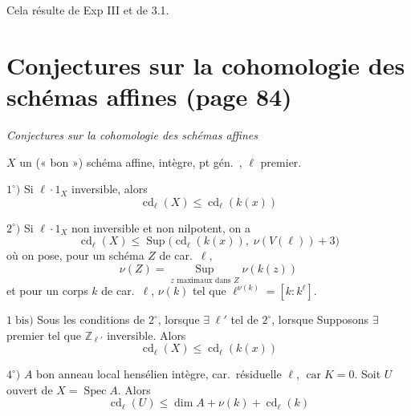 \documentclass[11pt,a4paper]{article}
\begin{document}
Cela résulte de Exp III et de 3.1.

\section*{Conjectures sur la cohomologie des schémas affines (page 84)}


\emph{Conjectures sur la cohomologie des schémas affines}

$X$ un (« bon ») schéma affine, intègre, pt gén.\ , $\ell$  premier.

$1^{\circ})$ Si $\ell \cdot 1_{X}$ inversible, alors
\[
\operatorname{cd}_{\ell}(X) \leqslant \operatorname{cd}_{\ell}(k(x))
\]

$2^{\circ})$ Si $\ell \cdot 1_{X}$ non inversible et non nilpotent, on a
\[
\operatorname{cd}_{\ell}(X) \leqslant
\operatorname{Sup}\bigl(\operatorname{cd}_{\ell}(k(x)),\;
\nu(V(\ell)) + 3\bigr)
\]
où on pose, pour un schéma $Z$ de car.\ $\ell$,
\[
\nu(Z) = \operatorname*{Sup}_{z \text{ maximaux dans } Z} \nu(k(z))
\]
et pour un corps $k$ de car.\ $\ell$, $\nu(k)$ tel que
$\ell^{\nu(k)} = [k : k^{\ell}]$.

$1\;\mathrm{bis})$ Sous les conditions de $2^{\circ}$, lorsque $\exists\;
\ell'$ tel  
  \ill{}
 de $2^{\circ}$, lorsque Supposons $\exists$ \struck{\ill{}} 
premier tel que $\mathbb{Z}_{\ell'}$ inversible. Alors
\[
\operatorname{cd}_{\ell}(X) \leqslant \operatorname{cd}_{\ell}(k(x))
\]

$4^{\circ})$ $A$ bon anneau local hensélien intègre, car.\ résiduelle $\ell$,
$\operatorname{car} K = 0$. Soit $U$  ouvert  de
$X = \operatorname{Spec} A$. Alors
\[
\operatorname{cd}_{\ell}(U) \leqslant \dim A + \nu(k) +
\operatorname{cd}_{\ell}(k)
\]
\end{document}
